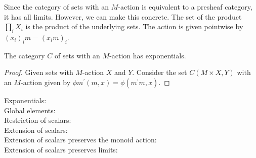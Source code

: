 \begin{remark}
  Since the category of sets with an $ M $-action is equivalent to a presheaf category, it has all limits. However, we can make this concrete. The set of the product $ \prod_i X_i $ is the product of the underlying sets. The action is given pointwise by $ (x_i)_i m = (x_i m)_i $.
\end{remark}

\begin{lemma}
  The category $ C $ of sets with an $ M $-action has exponentials.
\end{lemma}
\begin{proof}
  Given sets with $ M $-action $ X $ and $ Y $. Consider the set $ C(M \times X, Y) $ with an $ M $-action given by $ \phi m^\prime(m, x) = \phi(m^\prime m, x) $.
\end{proof}

Exponentials: \TODO\\
Global elements: \TODO\\
Restriction of scalars: \TODO\\
Extension of scalars: \TODO\\
Extension of scalars preserves the monoid action: \TODO\\
Extension of scalars preserves limits: \TODO
